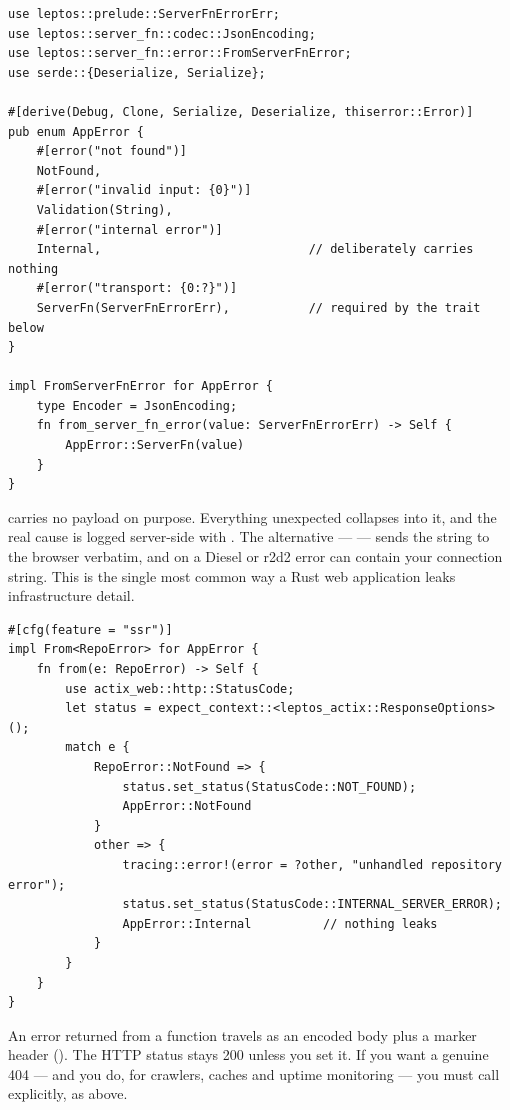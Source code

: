 \begin{lstlisting}[style=rs,caption={\file{src/error.rs} --- ungated, and the only error the browser sees.}]
use leptos::prelude::ServerFnErrorErr;
use leptos::server_fn::codec::JsonEncoding;
use leptos::server_fn::error::FromServerFnError;
use serde::{Deserialize, Serialize};

#[derive(Debug, Clone, Serialize, Deserialize, thiserror::Error)]
pub enum AppError {
    #[error("not found")]
    NotFound,
    #[error("invalid input: {0}")]
    Validation(String),
    #[error("internal error")]
    Internal,                             // deliberately carries nothing
    #[error("transport: {0:?}")]
    ServerFn(ServerFnErrorErr),           // required by the trait below
}

impl FromServerFnError for AppError {
    type Encoder = JsonEncoding;
    fn from_server_fn_error(value: ServerFnErrorErr) -> Self {
        AppError::ServerFn(value)
    }
}
\end{lstlisting}

\begin{pattern}
 carries no payload on purpose. Everything unexpected collapses into it,
and the real cause is logged server-side with . The alternative ---
 --- sends the string to the browser verbatim,
and  on a Diesel or r2d2 error can contain your connection string. This is
the single most common way a Rust web application leaks infrastructure detail.
\end{pattern}

\begin{lstlisting}[style=rs,caption={The mapping layer: where a domain error becomes a wire error.}]
#[cfg(feature = "ssr")]
impl From<RepoError> for AppError {
    fn from(e: RepoError) -> Self {
        use actix_web::http::StatusCode;
        let status = expect_context::<leptos_actix::ResponseOptions>();
        match e {
            RepoError::NotFound => {
                status.set_status(StatusCode::NOT_FOUND);
                AppError::NotFound
            }
            other => {
                tracing::error!(error = ?other, "unhandled repository error");
                status.set_status(StatusCode::INTERNAL_SERVER_ERROR);
                AppError::Internal          // nothing leaks
            }
        }
    }
}
\end{lstlisting}

\begin{pitfall}
An error returned from a \code{\#[server]} function travels as an encoded body plus a marker
header (). The HTTP status stays 200 unless you set it. If you
want a genuine 404 --- and you do, for crawlers, caches and uptime monitoring --- you must call
 explicitly, as above.
\end{pitfall}


